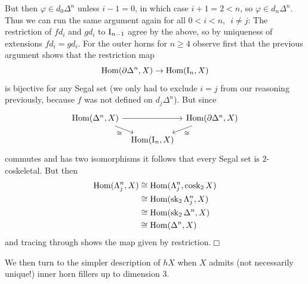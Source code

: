         But then $\varphi \in d_0 \Delta^n$ unless $i - 1 = 0$, in which case $i + 1 = 2 < n$, so $\varphi \in d_n \Delta^n$. Thus we can run the same argument again for all $0 < i < n, \enspace i \neq j$: The restriction of $f d_i$ and $g d_i$ to $\mathrm{I}_{n-1}$ agree by the above, so by uniqueness of extensions $f d_i = g d_i$.
        For the outer horns for $n \geq 4$ observe first that the previous argument shows that the restriction map
        \begin{equation*}
            \operatorname{Hom}(\partial \Delta^n, X) \to \operatorname{Hom}(\mathrm{I}_n, X)
        \end{equation*}
        is bijective for any Segal set (we only had to exclude $i = j$ from our reasoning previously, because $f$ was not defined on $d_j \Delta^n$). But since
        \begin{equation*}
            \begin{tikzcd}[row sep=small, column sep=tiny]
                {\Hom(\Delta^n, X)} \arrow[rd, "\cong"'] \arrow[rr] &                  & {\Hom(\partial \Delta^n, X)} \arrow[ld, "\cong"] \\
                                                    & {\Hom(\II_n, X)} &                                                 
            \end{tikzcd}
        \end{equation*}
        commutes and has two isomorphisms it follows that every Segal set is $2$-coskeletal. But then
        \begin{align*}
            \operatorname{Hom}(\Lambda^{n}_{j}, X) &\cong \operatorname{Hom}(\Lambda^{n}_{j}, \operatorname{cosk}_2 X) \\                                     &\cong \operatorname{Hom}(\operatorname{sk}_2 \Lambda^{n}_{j}, X) \\
                                 &\cong \operatorname{Hom}(\operatorname{sk}_2 \Delta^n, X) \\
                                 &\cong \operatorname{Hom}(\Delta^n, X)
        \end{align*}
        and tracing through shows the map given by restriction.\hfill$\Box$
        \medskip

        We then turn to the simpler description of $hX$ when $X$ admits (not necessarily unique!) inner horn fillers up to dimension $3$.


